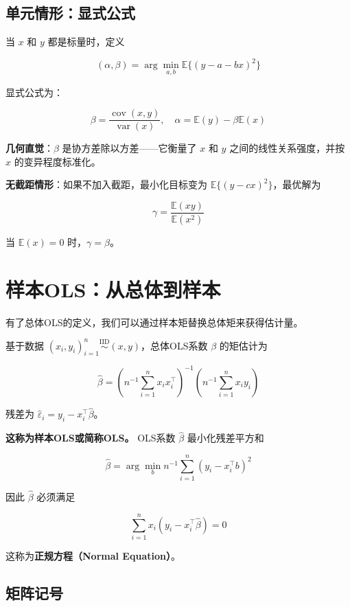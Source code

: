 \subsection{单元情形：显式公式}\label{sec:B-univariate-case}

当 $x$ 和 $y$ 都是标量时，定义

\[
(\alpha, \beta) = \arg\min_{a,b} \mathbb{E}\{(y - a - b x)^2\}
\]

显式公式为：

\[
\beta = \frac{\operatorname{cov}(x, y)}{\operatorname{var}(x)}, \quad \alpha = \mathbb{E}(y) - \beta \mathbb{E}(x)
\tag{B.5}
\]

\textbf{几何直觉}：$\beta$ 是协方差除以方差——它衡量了 $x$ 和 $y$ 之间的线性关系强度，并按 $x$ 的变异程度标准化。

\textbf{无截距情形}：如果不加入截距，最小化目标变为 $\mathbb{E}\{(y - c x)^2\}$，最优解为

\[
\gamma = \frac{\mathbb{E}(xy)}{\mathbb{E}(x^2)}
\tag{B.6}
\]

当 $\mathbb{E}(x) = 0$ 时，$\gamma = \beta$。

\section{样本OLS：从总体到样本}\label{sec:B-sample-ols}

有了总体OLS的定义，我们可以通过样本矩替换总体矩来获得估计量。

基于数据 $(x_i, y_i)_{i=1}^n \stackrel{\mathrm{IID}}{\sim} (x, y)$，总体OLS系数 $\beta$ 的矩估计为

\[
\hat{\beta} = \left(n^{-1}\sum_{i=1}^n x_i x_i^\top\right)^{-1} \left(n^{-1}\sum_{i=1}^n x_i y_i\right)
\tag{B.7}
\]

残差为 $\hat{\varepsilon}_i = y_i - x_i^\top \hat{\beta}$。

\textbf{这称为样本OLS或简称OLS。} OLS系数 $\hat{\beta}$ 最小化残差平方和

\[
\hat{\beta} = \arg\min_{b} n^{-1}\sum_{i=1}^n (y_i - x_i^\top b)^2
\tag{B.8}
\]

因此 $\hat{\beta}$ 必须满足

\[
\sum_{i=1}^n x_i(y_i - x_i^\top \hat{\beta}) = 0
\tag{B.9}
\]

这称为\textbf{正规方程（Normal Equation）}。

\subsection{矩阵记号}\label{sec:B-matrix-notation}

